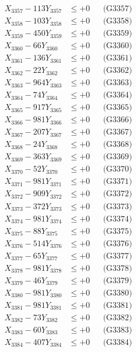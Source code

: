 \documentclass[a4paper,10pt]{article}
\begin{document}
{\begin{align}
X_{3357} - 113Y_{3357} &\leq +0 && \text{(G3357)} \\
X_{3358} - 103Y_{3358} &\leq +0 && \text{(G3358)} \\
X_{3359} - 450Y_{3359} &\leq +0 && \text{(G3359)} \\
X_{3360} - 66Y_{3360} &\leq +0 && \text{(G3360)} \\
\allowbreak
X_{3361} - 136Y_{3361} &\leq +0 && \text{(G3361)} \\
X_{3362} - 22Y_{3362} &\leq +0 && \text{(G3362)} \\
X_{3363} - 964Y_{3363} &\leq +0 && \text{(G3363)} \\
X_{3364} - 74Y_{3364} &\leq +0 && \text{(G3364)} \\
X_{3365} - 917Y_{3365} &\leq +0 && \text{(G3365)} \\
X_{3366} - 981Y_{3366} &\leq +0 && \text{(G3366)} \\
X_{3367} - 207Y_{3367} &\leq +0 && \text{(G3367)} \\
X_{3368} - 24Y_{3368} &\leq +0 && \text{(G3368)} \\
X_{3369} - 363Y_{3369} &\leq +0 && \text{(G3369)} \\
X_{3370} - 52Y_{3370} &\leq +0 && \text{(G3370)} \\
\allowbreak
X_{3371} - 981Y_{3371} &\leq +0 && \text{(G3371)} \\
X_{3372} - 909Y_{3372} &\leq +0 && \text{(G3372)} \\
X_{3373} - 372Y_{3373} &\leq +0 && \text{(G3373)} \\
X_{3374} - 981Y_{3374} &\leq +0 && \text{(G3374)} \\
X_{3375} - 88Y_{3375} &\leq +0 && \text{(G3375)} \\
X_{3376} - 514Y_{3376} &\leq +0 && \text{(G3376)} \\
X_{3377} - 65Y_{3377} &\leq +0 && \text{(G3377)} \\
X_{3378} - 981Y_{3378} &\leq +0 && \text{(G3378)} \\
X_{3379} - 46Y_{3379} &\leq +0 && \text{(G3379)} \\
X_{3380} - 981Y_{3380} &\leq +0 && \text{(G3380)} \\
\allowbreak
X_{3381} - 981Y_{3381} &\leq +0 && \text{(G3381)} \\
X_{3382} - 73Y_{3382} &\leq +0 && \text{(G3382)} \\
X_{3383} - 60Y_{3383} &\leq +0 && \text{(G3383)} \\
X_{3384} - 407Y_{3384} &\leq +0 && \text{(G3384)} \\

\end{align}}
\end{document}
